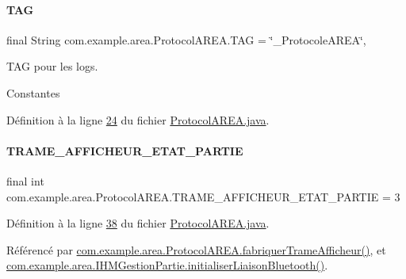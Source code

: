 \paragraph{\texorpdfstring{T\+AG}{TAG}}
{\footnotesize\ttfamily final String com.\+example.\+area.\+Protocol\+A\+R\+E\+A.\+T\+AG = \char`\"{}\+\_\+\+Protocole\+A\+R\+EA\char`\"{}\hspace{0.3cm}{\ttfamily [static]}, {\ttfamily [private]}}



T\+AG pour les logs. 

Constantes 

Définition à la ligne \hyperlink{_protocol_a_r_e_a_8java_source_l00024}{24} du fichier \hyperlink{_protocol_a_r_e_a_8java_source}{Protocol\+A\+R\+E\+A.\+java}.

\mbox{\label{classcom_1_1example_1_1area_1_1_protocol_a_r_e_a_a685ef5127e28517ca42fafb5cd6ba25a}} 
\paragraph{\texorpdfstring{T\+R\+A\+M\+E\+\_\+\+A\+F\+F\+I\+C\+H\+E\+U\+R\+\_\+\+E\+T\+A\+T\+\_\+\+P\+A\+R\+T\+IE}{TRAME\_AFFICHEUR\_ETAT\_PARTIE}}
{\footnotesize\ttfamily final int com.\+example.\+area.\+Protocol\+A\+R\+E\+A.\+T\+R\+A\+M\+E\+\_\+\+A\+F\+F\+I\+C\+H\+E\+U\+R\+\_\+\+E\+T\+A\+T\+\_\+\+P\+A\+R\+T\+IE = 3\hspace{0.3cm}{\ttfamily [static]}}



Définition à la ligne \hyperlink{_protocol_a_r_e_a_8java_source_l00038}{38} du fichier \hyperlink{_protocol_a_r_e_a_8java_source}{Protocol\+A\+R\+E\+A.\+java}.



Référencé par \hyperlink{_protocol_a_r_e_a_8java_source_l00048}{com.\+example.\+area.\+Protocol\+A\+R\+E\+A.\+fabriquer\+Trame\+Afficheur()}, et \hyperlink{_i_h_m_gestion_partie_8java_source_l00329}{com.\+example.\+area.\+I\+H\+M\+Gestion\+Partie.\+initialiser\+Liaison\+Bluetooth()}.

